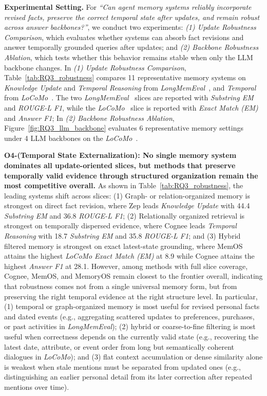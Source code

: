 \documentclass{llmxive}
\providecommand{\llm}{\textsc{LLM}\xspace}
\begin{document}
\noindent \textbf{Experimental Setting.}
For \textit{``Can agent memory systems reliably incorporate revised facts, preserve the correct temporal state after updates, and remain robust across answer backbones?''}, we conduct two experiments: \textit{(1) Update Robustness Comparison}, which evaluates whether systems can absorb fact revisions and answer temporally grounded queries after updates; and \textit{(2) Backbone Robustness Ablation}, which tests whether this behavior remains stable when only the \llm backbone changes.
In \textit{(1) Update Robustness Comparison}, Table~\ref{tab:RQ3_robustness} compares 11 representative memory systems on \textit{Knowledge Update} and \textit{Temporal Reasoning} from \textit{LongMemEval}~\cite{wu2024longmemeval}, and \textit{Temporal} from \textit{LoCoMo}~\cite{maharana2024locomo}.
The two \textit{LongMemEval}~\cite{wu2024longmemeval} slices are reported with \textit{Substring EM} and \textit{ROUGE-L F1}, while the \textit{LoCoMo}~\cite{maharana2024locomo} slice is reported with \textit{Exact Match (EM)} and \textit{Answer F1};
In \textit{(2) Backbone Robustness Ablation}, Figure~\ref{fig:RQ3_llm_backbone} evaluates 6 representative memory settings under 4 \llm backbones on the \textit{LoCoMo}~\cite{maharana2024locomo}.

\noindent \textbf{O4-(Temporal State Externalization): No single memory system dominates all update-oriented slices, but methods that preserve temporally valid evidence through structured organization remain the most competitive overall.}
As shown in Table~\ref{tab:RQ3_robustness}, the leading systems shift across slices:
(1) Graph- or relation-organized memory is strongest on direct fact revision, where Zep leads \textit{Knowledge Update} with 44.4 \textit{Substring EM} and 36.8 \textit{ROUGE-L F1};
(2) Relationally organized retrieval is strongest on temporally dispersed evidence, where Cognee leads \textit{Temporal Reasoning} with 18.7 \textit{Substring EM} and 35.8 \textit{ROUGE-L F1};
and (3) Hybrid filtered memory is strongest on exact latest-state grounding, where MemOS attains the highest \textit{LoCoMo} \textit{Exact Match (EM)} at 8.9 while Cognee attains the highest \textit{Answer F1} at 28.1.
However, among methods with full slice coverage, Cognee, MemOS, and MemoryOS remain closest to the frontier overall, indicating that robustness comes not from a single universal memory form, but from preserving the right temporal evidence at the right structure level.
In particular, (1) temporal or graph-organized memory is most useful for revised personal facts and dated events (e.g., aggregating scattered updates to preferences, purchases, or past activities in \textit{LongMemEval}); (2) hybrid or coarse-to-fine filtering is most useful when correctness depends on the currently valid state (e.g., recovering the latest date, attribute, or event order from long but semantically coherent dialogues in \textit{LoCoMo}); and (3) flat context accumulation or dense similarity alone is weakest when stale mentions must be separated from updated ones (e.g., distinguishing an earlier personal detail from its later correction after repeated mentions over time).
\end{document}
